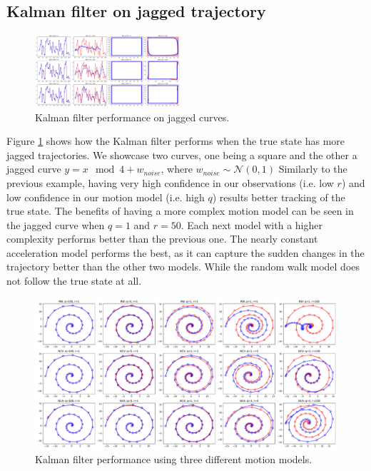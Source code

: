 \documentclass[9pt]{IEEEtran}
\begin{document}
\subsection*{Kalman filter on jagged trajectory}
\begin{figure}[h!]
    \centering
    \includegraphics[width=0.48\textwidth]{kalman_filter_other.pdf}
    \caption{Kalman filter performance on jagged curves.}
    \label{fig:jagged}
\end{figure}

Figure \ref{fig:jagged} shows how the Kalman filter performs when the true state has more jagged trajectories.
We showcase two curves, one being a square and the other a jagged curve $y = x \mod 4 + w_{noise}$, where $w_{noise} \sim \mathcal{N}(0, 1) $ 
Similarly to the previous example, having very high confidence in our observations (i.e. low $r$) and low confidence in our motion model (i.e. high $q$) results better tracking of the true state.
The benefits of having a more complex motion model can be seen in the jagged curve when $q=1$ and $r=50$.
Each next model with a higher complexity performs better than the previous one.
The nearly constant acceleration model performs the best, as it can capture the sudden changes in the trajectory better than the other two models.
While the random walk model does not follow the true state at all.

\begin{figure}
    \centering
    \includegraphics[width=\textwidth]{kalman_filter.pdf}
    \caption{Kalman filter performance using three different motion models.}
    \label{fig:kalman}
\end{figure}
\end{document}
